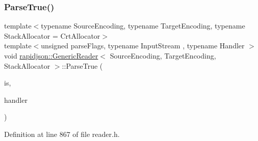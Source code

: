 \mbox{\label{classrapidjson_1_1_generic_reader_a73752e4f8bd6c1108e0adabf02334fc7}} 
\subsubsection{\texorpdfstring{ParseTrue()}{ParseTrue()}}
{\footnotesize\ttfamily template$<$typename Source\+Encoding, typename Target\+Encoding, typename Stack\+Allocator = Crt\+Allocator$>$ \\
template$<$unsigned parse\+Flags, typename Input\+Stream , typename Handler $>$ \\
void \mbox{\hyperlink{classrapidjson_1_1_generic_reader}{rapidjson\+::\+Generic\+Reader}}$<$ Source\+Encoding, Target\+Encoding, Stack\+Allocator $>$\+::Parse\+True (\begin{DoxyParamCaption}\item[{Input\+Stream \&}]{is,  }\item[{\mbox{\hyperlink{classrapidjson_1_1_handler}{Handler}} \&}]{handler }\end{DoxyParamCaption})\hspace{0.3cm}{\ttfamily [private]}}



Definition at line 867 of file reader.\+h.



